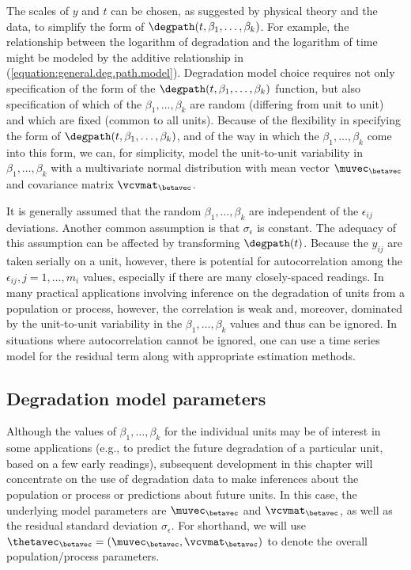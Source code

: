 The scales of $y$ and $t$ can be chosen, as suggested by physical
theory and the data, to simplify the form of
$\degpath(t,\beta_{1},\dots,\beta_{k})$.  For example, the
relationship between the logarithm of degradation and the logarithm of
time might be modeled by the additive relationship in
(\ref{equation:general.deg.path.model}).  Degradation model choice
requires not only specification of the form of the
$\degpath(t,\beta_{1},\dots,\beta_{k})$ function, but also
specification of which of the $\beta_{1}, \dots, \beta_{k}$ are random
(differing from unit to unit) and which are fixed (common to all units). 
Because of the flexibility in specifying
the form of $\degpath(t,\beta_{1},\dots,\beta_{k})$, and of the way in
which the $\beta_{1}, \dots, \beta_{k}$ come into this form, we can,
for simplicity, model the unit-to-unit variability in
$\beta_{1},\dots,\beta_{k}$ with a multivariate
normal distribution with mean vector $\muvec_{\betavec}$ and covariance
matrix $\vcvmat_{\betavec}$.

It is generally assumed that the random $\beta_{1}, \dots, \beta_{k}$ 
are independent of the $\epsilon_{ij}$ deviations. Another common 
assumption is that $\sigma_{\epsilon}$ is constant. The adequacy of this
assumption can be affected by transforming $\degpath(t)$. Because
the $y_{ij}$ are taken serially on a unit, however, there is potential for
autocorrelation among the $\epsilon_{ij}, j=1, \dots, m_{i}$
values, especially if there are many closely-spaced readings.
In many practical applications involving inference on the degradation
of units from a population or process, however, the correlation is
weak and, moreover, dominated by the unit-to-unit variability in the
$\beta_{1}, \dots, \beta_{k}$ values and thus can be ignored. In situations
where autocorrelation cannot be ignored, one can use a time series model
for the residual term along with appropriate estimation methods.

\subsection{Degradation model parameters}
Although the values of $\beta_{1},\dots,\beta_{k}$ for the
individual units may be of interest in some applications (e.g., to
predict the future degradation of a particular unit, based on a few
early readings), subsequent development in this chapter will
concentrate on the use of degradation data to make inferences about
the population or process or predictions about future units.
In this case, the underlying
model parameters are $\muvec_{\betavec}$ and $\vcvmat_{\betavec}$, as well
as the residual standard deviation $\sigma_{\epsilon}$. For
shorthand, we will use
$\thetavec_{\betavec}=(\muvec_{\betavec},\vcvmat_{\betavec})$ to denote the
overall population/process parameters.

